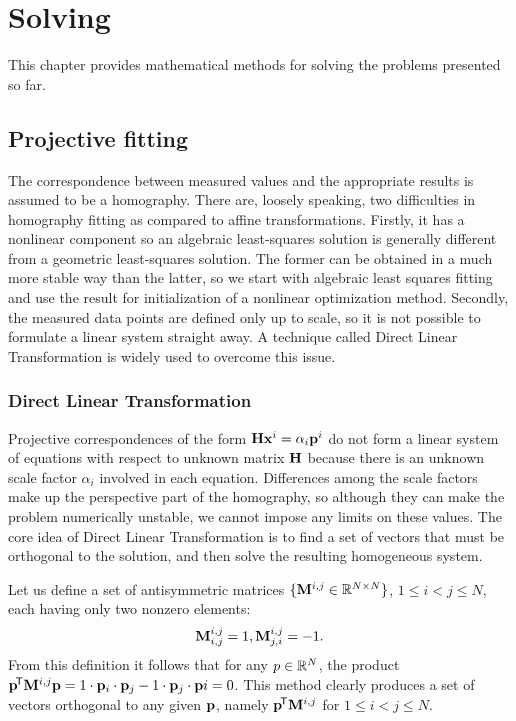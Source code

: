 \chapter{Solving}

This chapter provides mathematical methods for solving the problems presented so far.

\section{Projective fitting}

The correspondence between measured values and the appropriate results is assumed to be a homography.
There are, loosely speaking, two difficulties in homography fitting as compared to affine transformations.
Firstly, it has a nonlinear component so an algebraic least-squares solution is generally different from a geometric least-squares solution.
The former can be obtained in a much more stable way than the latter, so we start with algebraic least squares fitting and use the result for initialization of a nonlinear optimization method.
Secondly, the measured data points are defined only up to scale, so it is not possible to formulate a linear system straight away.
A technique called Direct Linear Transformation is widely used to overcome this issue.

\subsection{Direct Linear Transformation}

Projective correspondences of the form $\mathbf{H} \mathbf{x}^i = \alpha_i \mathbf{p}^i$ do not form a linear system of equations with respect to unknown matrix $\mathbf{H}$ because there is an unknown scale factor $\alpha_i$ involved in each equation.
Differences among the scale factors make up the perspective part of the homography, so although they can make the problem numerically unstable, we cannot impose any limits on these values.
The core idea of Direct Linear Transformation is to find a set of vectors that must be orthogonal to the solution, and then solve the resulting homogeneous system.

Let us define a set of antisymmetric matrices $\{\mathbf{M}^{i, j} \in \mathbb{R}^{N \times N}\}$, $1 \leq i < j \leq N$, each having only two nonzero elements:
$$\mathbf{M}^{i, j}_{i, j} = 1,
\mathbf{M}^{i, j}_{j, i} = -1.$$
From this definition it follows that for any $p \in \mathbb{R}^N$, the product $\mathbf{p}^{\!\mathsf{T}} \mathbf{M}^{i, j} \mathbf{p} = 1 \cdot \mathbf{p}_{i} \cdot \mathbf{p}_{j} - 1 \cdot \mathbf{p}_{j} \cdot \mathbf{p}{i} = 0$.
This method clearly produces a set of vectors orthogonal to any given $\mathbf{p}$, namely $\mathbf{p}^{\!\mathsf{T}} \mathbf{M}^{i, j}$ for $1 \leq i < j \leq N$.

